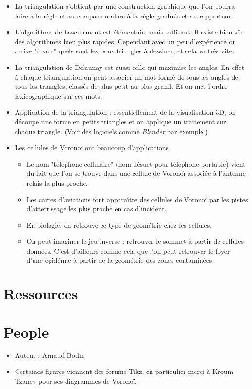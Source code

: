\documentclass[class=report,crop=false, 12pt]{standalone}
\begin{document}
\begin{itemize}
  \item La triangulation s'obtient par une construction graphique que l'on pourra faire à la règle et au compas ou alors à la règle graduée et au rapporteur. 

  \item L'algorithme de basculement est élémentaire mais suffisant. Il existe bien sûr des algorithmes bien plus rapides. Cependant avec un peu d'expérience on arrive "à voir" quels sont les bons triangles à dessiner, et cela va très vite.

  \item La triangulation de Delaunay est aussi celle qui maximise les angles. 
  En effet à chaque triangulation on peut associer un mot formé de tous les angles de tous les triangles, classés de plus petit au plus grand. Et on met l'ordre lexicographique sur ces mots.   

  \item Application de la triangulation : essentiellement de la visualisation 3D, on découpe une forme en petits triangles et on applique un traitement sur chaque triangle. (Voir des logiciels comme \emph{Blender} par exemple.)
  
  \item Les cellules de Voronoï ont beaucoup d'applications.
  \begin{itemize}
    \item Le nom "téléphone cellulaire" (nom désuet pour téléphone portable) vient du fait que l'on se trouve dans une cellule de Voronoï associée à l'antenne-relais la plus proche.
    \item Les cartes d'aviations font apparaître des cellules de Voronoï par les pistes d’atterrissage les plus proche en cas d'incident.
    \item En biologie, on retrouve ce type de géométrie chez les cellules.
    \item On peut imaginer le jeu inverse : retrouver le sommet à partir de cellules données. C'est d'ailleurs comme cela que l'on peut retrouver le foyer d'une épidémie à partir de la géométrie des zones contaminées.
  \end{itemize}
\end{itemize}



\section*{Ressources}

\section*{People}

\begin{itemize}
  \item Auteur : Arnaud Bodin
  \item Certaines figures viennent des forums Tikz, en particulier merci à Kroum Tzanev pour ses diagrammes de Voronoï.
\end{itemize}
\end{document}
